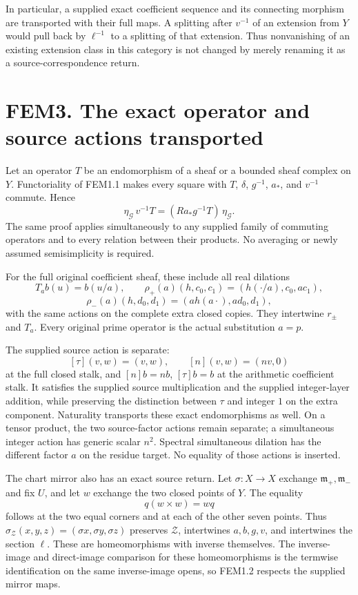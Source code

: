 In particular, a supplied exact coefficient sequence and its connecting
morphism are transported with their full maps. A splitting after
\(v^{-1}\) of an extension from \(Y\) would pull back by \(\ell^{-1}\)
to a splitting of that extension. Thus nonvanishing of an existing
extension class in this category is not changed by merely renaming it as
a source-correspondence return.

\section{FEM3. The exact operator and source actions
transported}\label{fem3.-the-exact-operator-and-source-actions-transported}

Let an operator \(T\) be an endomorphism of a sheaf or a bounded sheaf
complex on \(Y\). Functoriality of FEM1.1 makes every square with \(T\),
\(\delta\), \(g^{-1}\), \(a_*\), and \(v^{-1}\) commute. Hence \[
\eta_{\mathcal G}\,v^{-1}T
=(Ra_*g^{-1}T)\,\eta_{\mathcal G}.
\tag{FEM3.1}
\] The same proof applies simultaneously to any supplied family of
commuting operators and to every relation between their products. No
averaging or newly assumed semisimplicity is required.

For the full original coefficient sheaf, these include all real
dilations \[
T_a b(u)=b(u/a),\qquad
\rho_+(a)(h,c_0,c_1)=(h(\cdot/a),c_0,ac_1),
\] \[
\rho_-(a)(h,d_0,d_1)=(a h(a\cdot),ad_0,d_1),
\tag{FEM3.2}
\] with the same actions on the complete extra closed copies. They
intertwine \(r_\pm\) and \(T_a\). Every original prime operator is the
actual substitution \(a=p\).

The supplied source action is separate: \[
[\tau](v,w)=(v,w),\qquad [n](v,w)=(nv,0)
\] at the full closed stalk, and \([n]b=nb\), \([\tau]b=b\) at the
arithmetic coefficient stalk. It satisfies the supplied source
multiplication and the supplied integer-layer addition, while preserving
the distinction between \(\tau\) and integer \(1\) on the extra
component. Naturality transports these exact endomorphisms as well. On a
tensor product, the two source-factor actions remain separate; a
simultaneous integer action has generic scalar \(n^2\). Spectral
simultaneous dilation has the different factor \(a\) on the residue
target. No equality of those actions is inserted.

The chart mirror also has an exact source return. Let \(\sigma:X\to X\)
exchange \(\mathfrak m_+,\mathfrak m_-\) and fix \(U\), and let \(w\)
exchange the two closed points of \(Y\). The equality \[
q(w\times w)=wq
\] follows at the two equal corners and at each of the other seven
points. Thus \(\sigma_{\mathcal Z}(x,y,z)=(\sigma x,\sigma y,\sigma z)\)
preserves \(\mathcal Z\), intertwines \(a,b,g,v\), and intertwines the
section \(\ell\). These are homeomorphisms with inverse themselves. The
inverse-image and direct-image comparison for these homeomorphisms is
the termwise identification on the same inverse-image opens, so FEM1.2
respects the supplied mirror maps.

